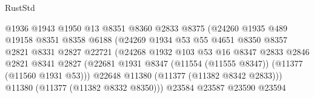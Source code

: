 \begin{lexlean}{RustStd}
\begin{coremodule}
                                        @1936
                                        @1943
                                        @1950
                                        @13
                                        @8351
                                        @8360
                                        @2833
                                        @8375
                                        (@24260
                                          @1935
                                          @489
                                          @19158
                                          @8351
                                          @8358
                                          @6188
                                          (@24269
                                            @1934
                                            @53
                                            @55
                                            @4651
                                            @8350
                                            @8357
                                            @2821
                                            @8331
                                            @2827
                                            @22721
                                            (@24268
                                              @1932
                                              @103
                                              @53
                                              @16
                                              @8347
                                              @2833
                                              @2846
                                              @2821
                                              @8341
                                              @2827
                                              (@22681
                                                @1931
                                                @8347
                                                (@11554 (@11555 @8347))
                                                (@11377 (@11560 @1931 @53)))
                                              @22648
                                              @11380
                                              (@11377 (@11382 @8342 @2833)))
                                            @11380
                                            (@11377 (@11382 @8332 @8350)))
                                          @23584
                                          @23587
                                          @23590
                                          @23594

\end{coremodule}
\end{lexlean}
